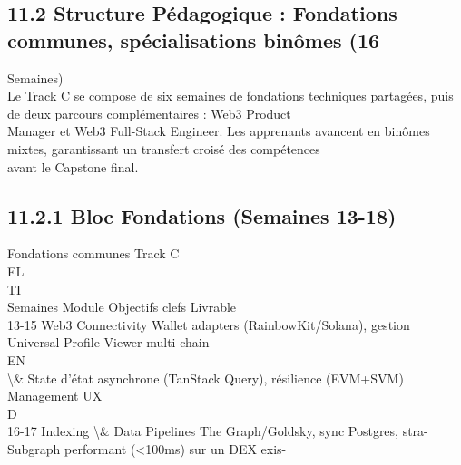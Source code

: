 \documentclass[12pt,landscape,a4paper]{article}
\begin{document}
\subsection{11.2 Structure Pédagogique : Fondations communes, spécialisations binômes (16}
Semaines)\\
Le Track C se compose de six semaines de fondations techniques partagées, puis de deux parcours complémentaires : Web3 Product\\
Manager et Web3 Full-Stack Engineer. Les apprenants avancent en binômes mixtes, garantissant un transfert croisé des compétences\\
avant le Capstone final.\\
\vspace{0.5em}
\vspace{0.5em}
\subsection{11.2.1 Bloc Fondations (Semaines 13-18)}
\vspace{0.5em}
Fondations communes Track C\\
\vspace{0.5em}
\vspace{0.5em}
\vspace{0.5em}
\vspace{0.5em}
EL\\
TI\\
Semaines Module                     Objectifs clefs                                Livrable\\
13-15     Web3 Connectivity Wallet adapters (RainbowKit/Solana), gestion Universal   Profile              Viewer      multi-chain\\
\vspace{0.5em}
\vspace{0.5em}
\vspace{0.5em}
\vspace{0.5em}
EN\\
\textbackslash{}& State           d’état asynchrone (TanStack Query), résilience (EVM+SVM)\\
Management        UX\\
\vspace{0.5em}
\vspace{0.5em}
\vspace{0.5em}
\vspace{0.5em}
D\\
16-17     Indexing \textbackslash{}& Data         Pipelines The Graph/Goldsky, sync Postgres, stra- Subgraph performant (\textless{}100ms) sur un DEX exis-\\
\end{document}
